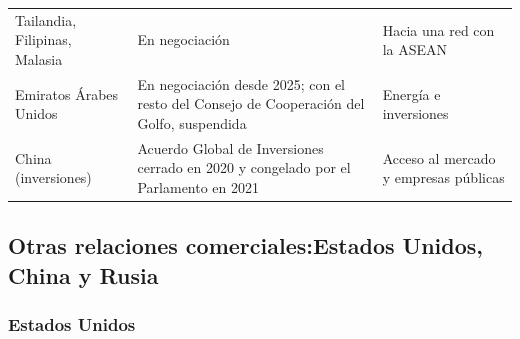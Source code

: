 \documentclass[11pt]{article}
\begin{document}
\begin{table}[H]
\begin{tabular}{>{\raggedright\arraybackslash}m{2.6cm}>{\raggedright\arraybackslash}m{6.2cm}>{\raggedright\arraybackslash}m{5.8cm}}
Tailandia, Filipinas, Malasia & En negociación & Hacia una red con la ASEAN\\
Emiratos Árabes Unidos & En negociación desde 2025; con el resto del Consejo de Cooperación del Golfo, suspendida & Energía e inversiones\\
China (inversiones) & Acuerdo Global de Inversiones cerrado en 2020 y congelado por el Parlamento en 2021 & Acceso al mercado y empresas públicas\\
\bottomrule
\end{tabular}
\end{table}

\subsection{Otras relaciones comerciales:\cortetitulo Estados Unidos, China y Rusia}\label{sec:otras}

\subsubsection{Estados Unidos}\label{sec:eeuu}
\end{document}
